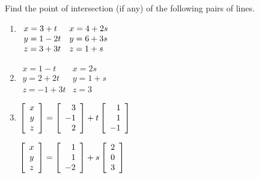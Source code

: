 \begin{multicols}{2}
\begin{ex}
\begin{sol}
\begin{enumerate}[label={\alph*.}]
\end{enumerate}
\end{sol}
\end{ex}

\begin{ex}
Find the point of intersection (if any) of the following pairs of lines.

\begin{enumerate}[label={\alph*.}]
\item 
$\begin{array}[t]{ll}
	x = 3 + t & x = 4 + 2s \\
	y = 1 - 2t & y = 6 + 3s \\
	z = 3 + 3t & z = 1 + s 
\end{array}$

\item
$\begin{array}{ll}
	x = 1 - t & x = 2s \\
	y = 2 + 2t & y = 1 + s \\
	z = -1 + 3t & z = 3 
\end{array}$

\item 
$\left[
\begin{array}{c}
x\\
y\\
z
\end{array}
\right]
=
\left[
\begin{array}{r}
3\\
-1\\
2
\end{array}
\right]
+ t
\left[
\begin{array}{r}
1\\
1\\
-1
\end{array}
\right]$

$\left[
\begin{array}{c}
x\\
y\\
z
\end{array}
\right]
=
\left[
\begin{array}{r}
1\\
1\\
-2
\end{array}
\right]
+ s
\left[
\begin{array}{r}
2\\
0\\
3
\end{array}
\right]$


\end{enumerate}
\end{ex}
\end{multicols}
